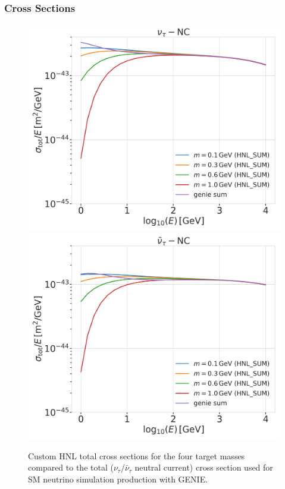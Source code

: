 \subsubsection{Cross Sections} 

\begin{figure}
    \includegraphics[width=.49\linewidth]{figures/hnl_simulation/cross_sections/custom_HNL_xsecs_final_SUM_flavorwise_total_xsecs_sigma-nutau-N-nc.png}
    \includegraphics[width=.49\linewidth]{figures/hnl_simulation/cross_sections/custom_HNL_xsecs_final_SUM_flavorwise_total_xsecs_sigma-nutaubar-N-nc.png}
    \caption{Custom HNL total cross sections for the four target masses compared to the total ($\nu_\tau$/$\bar{\nu}_\tau$ neutral current) cross section used for SM neutrino simulation production with GENIE.}
\end{figure}

